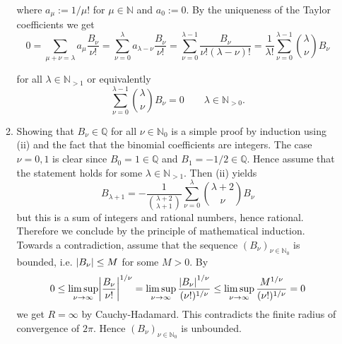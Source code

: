 \begin{enumerate}[label = \textbf{Exercise \arabic*.},wide = 0pt, itemsep=1.5ex]
\begin{enumerate}[label = (\roman*),wide = 0pt, itemsep=1.5ex]
			\noindent where $a_\mu := 1/\mu!$ for $\mu \in \mathbb{N}$ and $a_0 := 0$. By the uniqueness of the Taylor coefficients we get
			\begin{equation}
				0 = \sum_{\mu + \nu = \lambda}a_\mu\frac{B_\nu}{\nu!} = \sum_{\nu = 0}^\lambda a_{\lambda - \nu}\frac{B_\nu}{\nu!} = \sum_{\nu = 0}^{\lambda - 1} \frac{B_\nu}{\nu!(\lambda - \nu)!} = \frac{1}{\lambda !}\sum_{\nu = 0}^{\lambda - 1}{\lambda \choose \nu}B_\nu
			\end{equation}

			\noindent for all $\lambda \in \mathbb{N}_{>1}$ or equivalently
			\begin{equation}
				\boxed{\sum_{\nu = 0}^{\lambda - 1}{\lambda \choose \nu}B_\nu = 0 \qquad \lambda \in \mathbb{N}_{>0}.}
			\end{equation}

		\item Showing that $B_\nu \in \mathbb{Q}$ for all $\nu \in \mathbb{N}_0$ is a simple proof by induction using (ii) and the fact that the binomial coefficients are integers. The case $\nu = 0,1$ is clear since $B_0 = 1 \in \mathbb{Q}$ and $B_1 = -1/2 \in \mathbb{Q}$. Hence assume that the statement holds for some $\lambda \in \mathbb{N}_{>1}$. Then (ii) yields
			\begin{equation}
				B_{\lambda+1} = -\frac{1}{{\lambda + 2 \choose \lambda + 1}}\sum_{\nu = 0}^{\lambda}{\lambda + 2\choose \nu}B_\nu
			\end{equation}
			\noindent but this is a sum of integers and rational numbers, hence rational. Therefore we conclude by the principle of mathematical induction.\\
			Towards a contradiction, assume that the sequence $(B_\nu)_{\nu \in \mathbb{N}_0}$ is bounded, i.e. $\abs[0]{B_\nu} \leq M$ for some $M > 0$. By
			\begin{equation}
				0 \leq \limsup_{\nu \to \infty} \abs{\frac{B_\nu}{\nu!}}^{1/\nu} = \limsup_{\nu \to \infty}\frac{\abs[0]{B_\nu}^{1/\nu}}{(\nu !)^{1/\nu}} \leq \limsup_{\nu \to \infty} \frac{M^{1/\nu}}{(\nu !)^{1/\nu}} = 0
			\end{equation}
			\noindent we get $R = \infty$ by Cauchy-Hadamard. This contradicts the finite radius of convergence of $2\pi$. Hence $(B_\nu)_{\nu \in \mathbb{N}_0}$ is unbounded.
		\end{enumerate}
\end{enumerate}
\printbibliography

